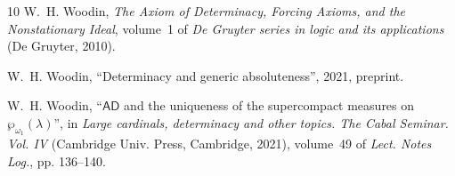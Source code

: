 \documentclass{amsart}
\begin{document}
\begin{thebibliography}{10}
W.~H. Woodin, \emph{{The Axiom of Determinacy, Forcing Axioms, and the
  Nonstationary Ideal}}, volume~1 of \emph{{De Gruyter series in logic and its
  applications}} (De Gruyter, 2010).

W.~H. Woodin, \enquote{Determinacy and generic absoluteness}, 2021, preprint.

W.~H. Woodin, \enquote{{$\mathsf{AD}$} and the uniqueness of the supercompact
  measures on {$\wp_{\omega_1}(\lambda)$}}, in \emph{Large cardinals,
  determinacy and other topics. {T}he {C}abal {S}eminar. {V}ol. {IV}}
  (Cambridge Univ. Press, Cambridge, 2021), volume~49 of \emph{Lect. Notes
  Log.}, pp. 136--140.

\end{thebibliography}
\end{document}
